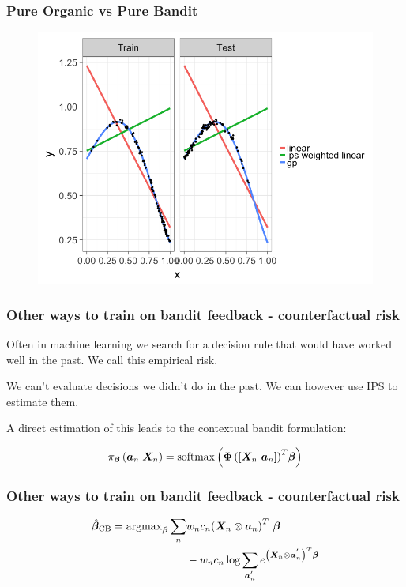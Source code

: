 \begin{frame}
  \frametitle{Pure Organic vs Pure Bandit}
\begin{figure}[h!]
\includegraphics[scale=0.34]{images/two_linear_models_and_gp5.png}
\centering
\end{figure}
\end{frame}


\begin{frame}
  \frametitle{Other ways to train on bandit feedback - counterfactual risk}

  Often in machine learning we search for a decision rule that would have worked well in the past.  \pause We call this empirical risk.

  \pause

  We can't evaluate decisions we didn't do in the past.  \pause We can however use IPS to estimate them.

  \pause

  A direct estimation of this leads to the contextual bandit formulation:

  \pause


  \[
    \pi_{\bm{\beta}}\left( {\bm{a}}_n | {\bm{X}}_n \right) = {\rm softmax}
      \left( {\bm{\Phi}
        \left(
          \left[ \bm{X}_n ~ \bm{a}_n \right]
        \right)}^T \bm{\beta}
      \right)
  \]  

\end{frame}


\begin{frame}
  \frametitle{Other ways to train on bandit feedback - counterfactual risk}

\begin{align*}
	\hat{\bm{\beta}}_{\rm CB} = {\rm argmax}_{\bm{\beta}} \sum_n
	& w_n c_n
		{\left(
			{\bm{X}}_n \otimes {\bm{a}}_n
		\right)}^T ~ \bm{\beta} \\
	& - w_n c_n \log \sum_{{\bm{a}}_{n}^{'}} e^{
						{\left(
							{\bm{X}}_n \otimes {\bm{a}}_{n}^{'}
						\right)}^T \bm{\beta}
						} \\
\end{align*}

\end{frame}



